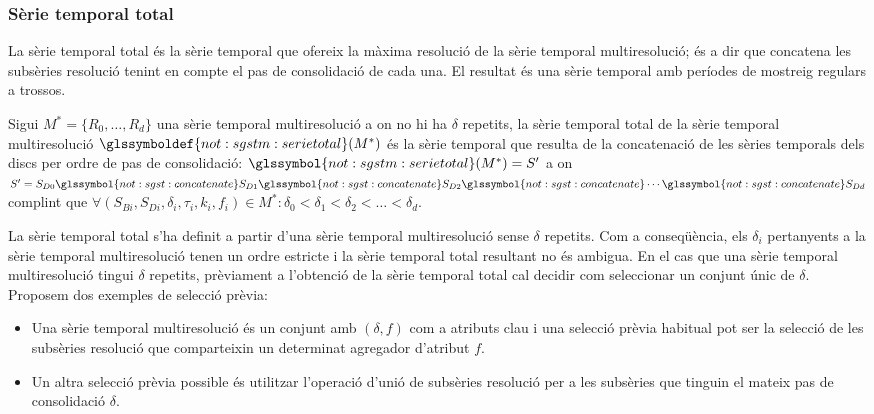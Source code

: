 \subsubsection{Sèrie temporal total}




La sèrie temporal total és la sèrie temporal que ofereix la màxima
resolució de la sèrie temporal multiresolució; és a dir que concatena
les subsèries resolució tenint en compte el pas de consolidació de
cada una. El resultat és una sèrie temporal amb períodes de mostreig
regulars a trossos.
\begin{definition}
  \label{def:sgstm:total}
  Sigui $M^*=\{R_0,\dotsc,R_{d}\}$ una sèrie temporal multiresolució a
  on no hi ha $\delta$ repetits, la sèrie temporal total de la sèrie
  temporal multiresolució $\glssymboldef{not:sgstm:serietotal}(M^*)$
  és la sèrie temporal que resulta de la concatenació de les sèries
  temporals dels discs per ordre de pas de consolidació:
  $\glssymbol{not:sgstm:serietotal}(M^*)=S'$ a on $S'= S_{D0}
  \glssymbol{not:sgst:concatenate} S_{D1} \glssymbol{not:sgst:concatenate} S_{D2} \glssymbol{not:sgst:concatenate} \dotsb \glssymbol{not:sgst:concatenate}
  S_{Dd}$ complint que $\forall
  (S_{Bi},S_{Di},\delta_i,\tau_i,k_i,f_i) \in M^* : \delta_0 <
  \delta_1 < \delta_2 < \dots < \delta_d$.
\end{definition}

La sèrie temporal total s'ha definit a partir d'una sèrie temporal
multiresolució sense $\delta$ repetits. Com a conseqüència, els
$\delta_i$ pertanyents a la sèrie temporal multiresolució tenen un
ordre estricte i la sèrie temporal total resultant no és ambigua.
En el cas que una sèrie temporal multiresolució tingui $\delta$
repetits, prèviament a l'obtenció de la sèrie temporal total cal
decidir com seleccionar un conjunt únic de $\delta$. Proposem dos
exemples de selecció prèvia:
\begin{itemize}
\item Una sèrie temporal multiresolució és un conjunt amb $(\delta,f)$
  com a atributs clau i una selecció prèvia habitual pot ser la
  selecció de les subsèries resolució que comparteixin un determinat
  agregador d'atribut $f$.
\item Un altra selecció prèvia possible és utilitzar l'operació d'unió
  de subsèries resolució per a les subsèries que tinguin el mateix pas
  de consolidació $\delta$.
\end{itemize}



